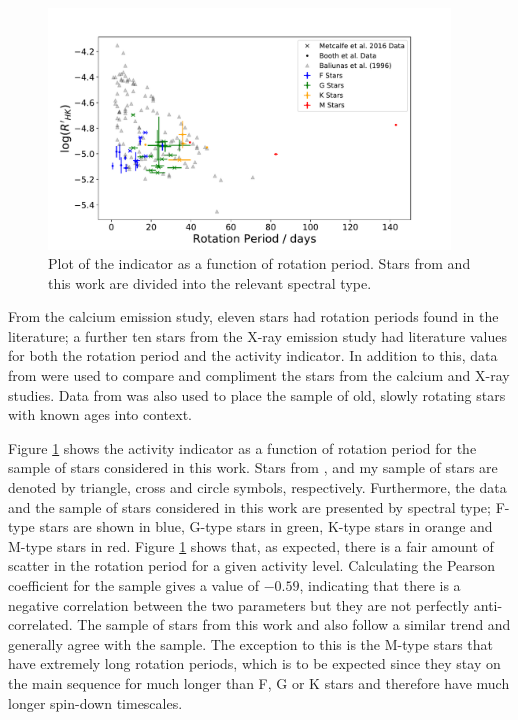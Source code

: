 \begin{figure}
    \centering
    \includegraphics[width=0.95\textwidth]{Figures/5-Activity_rotation/Rhk_v_prot.pdf}
    \caption[\Rprime indicator as a function of rotation period]{Plot of the \Rprime indicator as a function of rotation period. Stars from \citet{Metcalfe_etal_2016} and this work are divided into the relevant spectral type.}
    \label{fig:rhk_v_rot}
\end{figure}

From the calcium emission study, eleven stars had rotation periods found in the literature; a further ten stars from the X-ray emission study had literature values for both the rotation period and the \Rprime activity indicator. In addition to this, data from \citet{Metcalfe_etal_2016} were used to compare and compliment the stars from the calcium and X-ray studies. Data from \citet{Baliunas_etal_1996} was also used to place the sample of old, slowly rotating stars with known ages into context.

Figure \ref{fig:rhk_v_rot} shows the \Rprime activity indicator as a function of rotation period for the sample of stars considered in this work. Stars from \citet{Baliunas_etal_1996}, \citet{Metcalfe_etal_2016} and my sample of stars are denoted by triangle, cross and circle symbols, respectively. Furthermore, the \citet{Metcalfe_etal_2016} data and the sample of stars considered in this work are presented by spectral type; F-type stars are shown in blue, G-type stars in green, K-type stars in orange and M-type stars in red. Figure \ref{fig:rhk_v_rot} shows that, as expected, there is a fair amount of scatter in the rotation period for a given activity level. Calculating the Pearson coefficient for the \citet{Baliunas_etal_1996} sample gives a value of $-0.59$, indicating that there is a negative correlation between the two parameters but they are not perfectly anti-correlated. The sample of stars from this work and \citet{Metcalfe_etal_2016} also follow a similar trend and generally agree with the \citet{Baliunas_etal_1996} sample. The exception to this is the M-type stars that have extremely long rotation periods, which is to be expected since they stay on the main sequence for much longer than F, G or K stars and therefore have much longer spin-down timescales.


